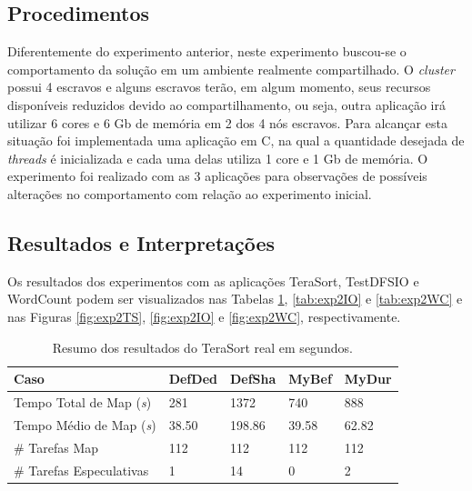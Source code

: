 \subsection{Procedimentos}
Diferentemente do experimento anterior, neste experimento buscou-se o comportamento da solução em um ambiente realmente compartilhado. O \textit{cluster} possui 4 escravos e alguns escravos terão, em algum momento, seus recursos disponíveis reduzidos devido ao compartilhamento, ou seja, outra aplicação irá utilizar 6 cores e 6 Gb de memória em 2 dos 4 nós escravos. Para alcançar esta situação foi implementada uma aplicação em C, na qual a quantidade desejada de \textit{threads} é inicializada e cada uma delas utiliza 1 core e 1 Gb de memória. O experimento foi realizado com as 3 aplicações para observações de possíveis alterações no comportamento com relação ao experimento inicial.

\subsection{Resultados e Interpretações}
Os resultados dos experimentos com as aplicações TeraSort, TestDFSIO e WordCount podem ser visualizados nas Tabelas \ref{tab:exp2TS}, \ref{tab:exp2IO} e \ref{tab:exp2WC} e nas Figuras \ref{fig:exp2TS}, \ref{fig:exp2IO} e \ref{fig:exp2WC}, respectivamente.

\begin{table}[h!]
	\caption{Resumo dos resultados do TeraSort real em segundos.} \label{tab:exp2TS}
	\begin{tabular*}{\hsize}{lllll} %
		\textbf{Caso} & \textbf{DefDed} & \textbf{DefSha} & \textbf{MyBef} & \textbf{MyDur}\\
		\hline
		Tempo Total de Map ({\it{s}}) & 281 & 1372 & 740 & 888 \\
		Tempo Médio de Map ({\it{s}}) & 38.50 & 198.86 & 39.58 & 62.82 \\
		\# Tarefas Map & 112 & 112 & 112 & 112 \\
		\# Tarefas Especulativas & 1 & 14 & 0 & 2 \\
	\end{tabular*}
\end{table}

